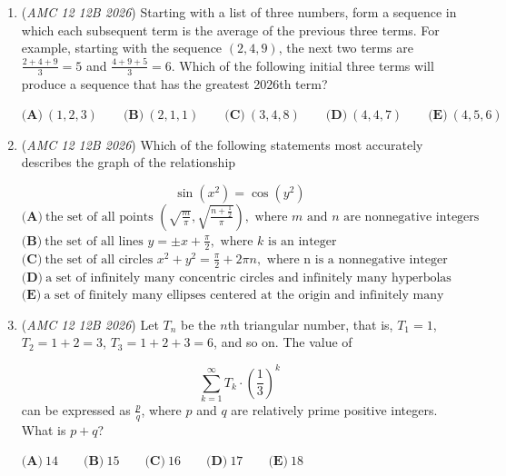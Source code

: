 \begin{enumerate}
 In centimeters, how much of the pole height is needed for the ribbon to wrap around exactly once?


 $\textbf{(A)}\   \frac{15}{2}  \qquad                 \textbf{(B)}\   8  \qquad                 \textbf{(C)}\   10  \qquad                 \textbf{(D)}\   \frac{25}{2}  \qquad                 \textbf{(E)}\   \frac{40}{3}$


	\item (\textit{AMC 12 12B 2026}) Starting with a list of three numbers, form a sequence in which each subsequent term is the average of the previous three terms. For example, starting with the sequence $(2,4,9)$, the next two terms are $\frac{2+4+9}{3} = 5$ and $\frac{4+9+5}{3} = 6$. Which of the following initial three terms will produce a sequence that has the greatest 2026th term?


 $\textbf{(A)}\   (1,2,3)  \qquad                 \textbf{(B)}\   (2,1,1)  \qquad                 \textbf{(C)}\   (3,4,8)  \qquad                 \textbf{(D)}\   (4,4,7)  \qquad                 \textbf{(E)}\   (4,5,6)$


	\item (\textit{AMC 12 12B 2026}) Which of the following statements most accurately describes the graph of the relationship

 \[\sin\left( x^{2} \right) = \cos\left( y^{2} \right)\]
$\textbf{(A)}\   \text{the set of all points } \left( \sqrt{ \frac{m}{\pi}}, \sqrt{\frac{n + \frac{1}{2}}{\pi}} \right), \text{ where } m \text{ and } n \text{ are nonnegative integers}$
$\textbf{(B)}\   \text{the set of all lines } y = \pm x + \frac{\pi}{2}, \text{ where } k \text{ is an integer}$
$\textbf{(C)}\   \text{the set of all circles } x^{2} + y^{2} = \frac{\pi}{2} + 2 \pi n, \text{ where n is a nonnegative integer}$
$\textbf{(D)}\   \text{a set of infinitely many concentric circles and infinitely many hyperbolas}$
$\textbf{(E)}\   \text{a set of finitely many ellipses centered at the origin and infinitely many parabolas}$


	\item (\textit{AMC 12 12B 2026}) Let $T_{n}$ be the $n$th triangular number, that is, $T_{1} = 1$, $T_{2} = 1+2 = 3$, $T_{3} = 1+2+3 = 6$, and so on. The value of

 \[\sum_{k=1}^{\infty} T_{k} \cdot \left( \frac{1}{3} \right)^{k}\]
can be expressed as $\frac{p}{q}$, where $p$ and $q$ are relatively prime positive integers. What is $p+q$?


 $\textbf{(A)}\   14  \qquad                 \textbf{(B)}\   15  \qquad                 \textbf{(C)}\   16  \qquad                 \textbf{(D)}\   17  \qquad                 \textbf{(E)}\   18$



\end{enumerate}
